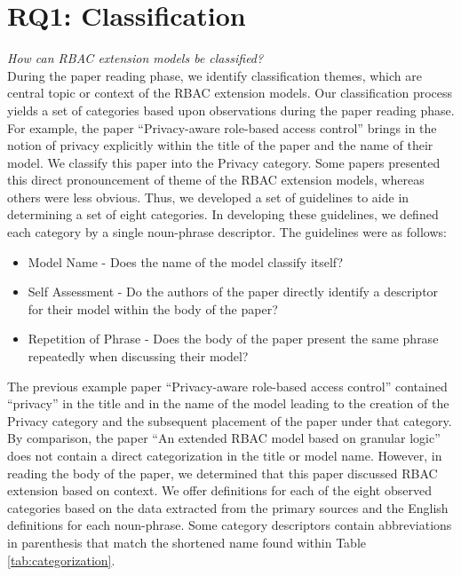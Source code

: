 \section{RQ1: Classification} \label{sec:categorization}

\textit{How can RBAC extension models be classified?}
\\

During the paper reading phase, we identify classification themes, which are
central topic or context of the RBAC extension models. Our classification process
yields a set of categories based upon observations during the paper reading phase.
For example, the paper ``Privacy-aware role-based access control'' \cite{ni2010privacy} brings in the notion of privacy explicitly within the title of the paper and the name of their model. We classify this paper into the Privacy category. Some papers presented this direct pronouncement of theme of the RBAC extension models, whereas others were less obvious.
Thus, we developed a set of guidelines to aide in determining a set of eight categories. 
In developing these guidelines, we defined each category by a single noun-phrase descriptor.
The guidelines were as follows:

\begin{itemize}
\item Model Name - Does the name of the model classify itself?
\item Self Assessment - Do the authors of the paper directly identify a descriptor for their model within the body of the paper?
\item Repetition of Phrase - Does the body of the paper present the same phrase repeatedly when discussing their model?
\end{itemize}

The previous example paper ``Privacy-aware role-based access control'' \cite{ni2010privacy} contained ``privacy'' in
the title and in the name of the model leading to the creation of the Privacy category and the subsequent placement of the paper under that category.
By comparison, the paper ``An extended RBAC model based on granular logic'' \cite{jian2008extended} does not contain a direct categorization in the title or model name. However, in reading the body of the paper, we determined that this paper discussed RBAC extension based on context. 
We offer definitions for each of the eight observed categories based on the data extracted from the primary sources and the English definitions for each noun-phrase. 
Some category descriptors contain abbreviations in parenthesis that match the shortened name found within Table \ref{tab:categorization}.


